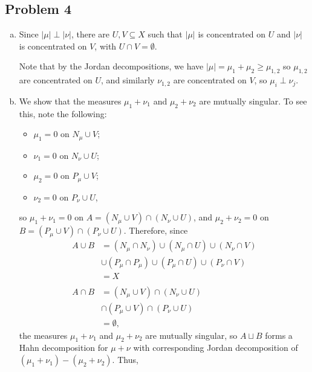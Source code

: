 \documentclass[10pt]{mypackage}
\begin{document}
\subsection{Problem 4}%
\begin{enumerate}[(a)]
  \item Since $\left\vert \mu \right\vert\perp \left\vert \nu \right\vert$, there are $U,V\subseteq X$ such that $\left\vert \mu \right\vert$ is concentrated on $U$ and $\left\vert \nu \right\vert$ is concentrated on $V$, with $U\cap V = \emptyset$.\newline

    Note that by the Jordan decompositions, we have $\left\vert \mu \right\vert = \mu_1 + \mu_2 \geq \mu_{1,2}$ so $\mu_{1,2}$ are concentrated on $U$, and similarly $\nu_{1,2}$ are concentrated on $V$, so $\mu_{i}\perp \nu_{j}$.
  \item We show that the measures $\mu_1 + \nu_1$ and $\mu_2 + \nu_2$ are mutually singular. To see this, note the following:
    \begin{itemize}
      \item $\mu_1 = 0$ on $N_{\mu}\cup V$;
      \item $\nu_1 = 0$ on $N_{\nu}\cup U$;
      \item $\mu_2 = 0$ on $P_{\mu}\cup V$;
      \item $\nu_2 = 0$ on $P_{\nu}\cup U$,
    \end{itemize}
    so $\mu_1 + \nu_1 = 0$ on $A = \left( N_{\mu}\cup V \right) \cap \left( N_{\nu}\cup U \right)$, and $\mu_2 + \nu_2 = 0$ on $B = \left( P_{\mu}\cup V \right)\cap \left( P_{\nu}\cup U \right)$. Therefore, since
    \begin{align*}
      A\cup B &= \left( N_{\mu}\cap N_{\nu} \right) \cup \left( N_{\mu}\cap U \right) \cup \left( N_{\nu}\cap V \right)\\
              &\cup \left( P_{\mu}\cap P_{\mu} \right) \cup \left( P_{\mu}\cap U \right) \cup \left( P_{\nu}\cap V \right)\\
              &= X\\
              \\
      A\cap B &= \left( N_{\mu}\cup V \right)\cap \left( N_{\nu}\cup U \right)\\
              &\cap \left( P_{\mu}\cup V \right) \cap \left( P_{\nu}\cup U \right)\\
              &= \emptyset,
    \end{align*}
    the measures $\mu_1 + \nu_1$ and $\mu_2 + \nu_2$ are mutually singular, so $A\sqcup B$ forms a Hahn decomposition for $\mu + \nu$ with corresponding Jordan decomposition of $\left( \mu_1 + \nu_1 \right) - \left( \mu_2 + \nu_2 \right)$. Thus,

\end{enumerate}
\end{document}
